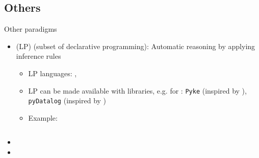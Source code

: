 \subsection{Others}




\begin{frame}{Other paradigms}
	\begin{itemize}
		\item {} (LP) (subset of declarative programming): Automatic reasoning by applying inference rules
		\begin{itemize}
			\item LP languages: , 
			\item LP can be made available with libraries, e.g. for : \texttt{Pyke} (inspired by ), \texttt{pyDatalog} (inspired by )
			\item Example:
			\inputminted[]{prolog}{code/paradigms/lp/siblings.pl}
		\end{itemize}
		\item {}
		\item {}
	\end{itemize}
\end{frame}
